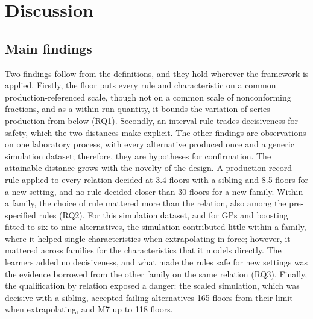 \documentclass[pdflatex,sn-basic,lineno]{sn-jnl}
\begin{document}
\section{Discussion}\label{sec:discussion}

\subsection{Main findings}

Two findings follow from the definitions, and they hold wherever the framework is applied. Firstly, the floor puts every rule and characteristic on a common production-referenced scale, though not on a common scale of nonconforming fractions, and as a within-run quantity, it bounds the variation of series production from below (RQ1). Secondly, an interval rule trades decisiveness for safety, which the two distances make explicit. The other findings are observations on one laboratory process, with every alternative produced once and a generic simulation dataset; therefore, they are hypotheses for confirmation. The attainable distance grows with the novelty of the design. A production-record rule applied to every relation decided at 3.4 floors with a sibling and 8.5 floors for a new setting, and no rule decided closer than 30 floors for a new family. Within a family, the choice of rule mattered more than the relation, also among the pre-specified rules (RQ2). For this simulation dataset, and for GPs and boosting fitted to six to nine alternatives, the simulation contributed little within a family, where it helped single characteristics when extrapolating in force; however, it mattered across families for the characteristics that it models directly. The learners added no decisiveness, and what made the rules safe for new settings was the evidence borrowed from the other family on the same relation (RQ3). Finally, the qualification by relation exposed a danger: the scaled simulation, which was decisive with a sibling, accepted failing alternatives 165 floors from their limit when extrapolating, and M7 up to 118 floors.
\end{document}
